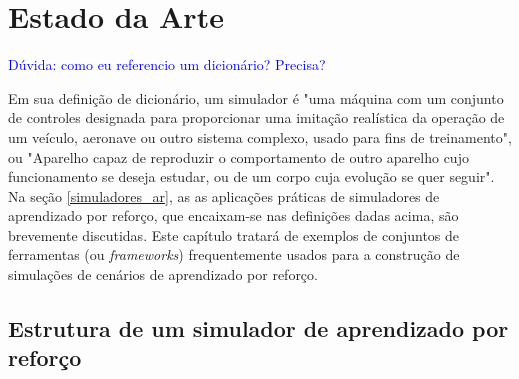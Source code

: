 \documentclass[cic,tc]{iiufrgs}
\newcommand\henrique[1]{\textcolor{blue}{#1}}
\begin{document}
%
%
%
%
%



\chapter{Estado da Arte}

\henrique{Dúvida: como eu referencio um dicionário? Precisa?}

Em sua definição de dicionário, um simulador é "uma máquina com um conjunto de
controles designada para proporcionar uma imitação realística da operação de um
veículo, aeronave ou outro sistema complexo, usado para fins de treinamento", ou
"Aparelho capaz de reproduzir o comportamento de outro aparelho cujo
funcionamento se deseja estudar, ou de um corpo cuja evolução se quer seguir".
Na seção \ref{simuladores_ar}, as as aplicações práticas de simuladores de
aprendizado por reforço, que encaixam-se nas definições dadas acima, são
brevemente discutidas. Este capítulo tratará de exemplos de conjuntos de
ferramentas (ou \textit{frameworks}) frequentemente usados para a construção de
simulações de cenários de aprendizado por reforço.

\section{Estrutura de um simulador de aprendizado por reforço}
\label{ar_structure}
\end{document}
